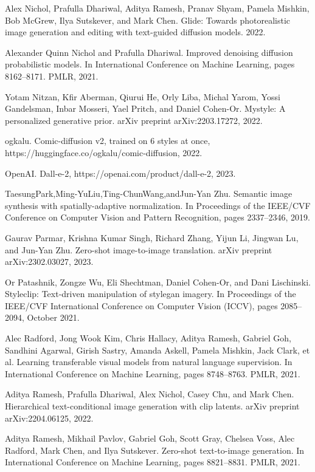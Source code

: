 \documentclass[a4paper,AutoFakeBold,oneside,12pt]{book}
\begin{document}
\begin{nopagenumber}
\noindent
[58] Alex Nichol, Prafulla Dhariwal, Aditya Ramesh, Pranav Shyam, Pamela Mishkin, Bob McGrew, Ilya Sutskever, and Mark Chen. Glide: Towards photorealistic image generation and editing with text-guided diffusion models. 2022.

\noindent
[59] Alexander Quinn Nichol and Prafulla Dhariwal. Improved denoising diffusion probabilistic models. In International Conference on Machine Learning, pages 8162–8171. PMLR, 2021.

\noindent
[60] Yotam Nitzan, Kfir Aberman, Qiurui He, Orly Liba, Michal Yarom, Yossi Gandelsman, Inbar Mosseri, Yael Pritch, and Daniel Cohen-Or. Mystyle: A personalized generative prior. arXiv preprint arXiv:2203.17272, 2022.

\noindent
[61] ogkalu. Comic-diffusion v2, trained on 6 styles at once, https://huggingface.co/ogkalu/comic-diffusion, 2022.

\noindent
[62] OpenAI. Dall-e-2, https://openai.com/product/dall-e-2, 2023.

\noindent
[63] TaesungPark,Ming-YuLiu,Ting-ChunWang,andJun-Yan Zhu. Semantic image synthesis with spatially-adaptive normalization. In Proceedings of the IEEE/CVF Conference on Computer Vision and Pattern Recognition, pages 2337–2346, 2019.

\noindent
[64] Gaurav Parmar, Krishna Kumar Singh, Richard Zhang, Yijun Li, Jingwan Lu, and Jun-Yan Zhu. Zero-shot image-to-image translation. arXiv preprint arXiv:2302.03027, 2023.

\noindent
[65] Or Patashnik, Zongze Wu, Eli Shechtman, Daniel Cohen-Or, and Dani Lischinski. Styleclip: Text-driven manipulation of stylegan imagery. In Proceedings of the IEEE/CVF International Conference on Computer Vision (ICCV), pages 2085–2094, October 2021.

\noindent
[66] Alec Radford, Jong Wook Kim, Chris Hallacy, Aditya Ramesh, Gabriel Goh, Sandhini Agarwal, Girish Sastry, Amanda Askell, Pamela Mishkin, Jack Clark, et al. Learning transferable visual models from natural language supervision. In International Conference on Machine Learning, pages 8748–8763. PMLR, 2021.

\noindent
[67] Aditya Ramesh, Prafulla Dhariwal, Alex Nichol, Casey Chu, and Mark Chen. Hierarchical text-conditional image generation with clip latents. arXiv preprint arXiv:2204.06125, 2022.

\noindent
[68] Aditya Ramesh, Mikhail Pavlov, Gabriel Goh, Scott Gray, Chelsea Voss, Alec Radford, Mark Chen, and Ilya Sutskever. Zero-shot text-to-image generation. In International Conference on Machine Learning, pages 8821–8831. PMLR, 2021.


\end{nopagenumber}
\end{document}
